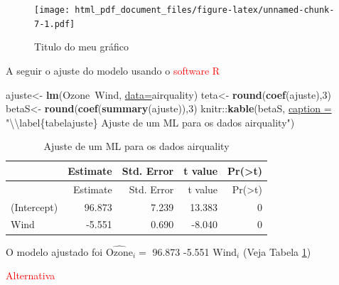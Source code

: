\documentclass[12pt,brazil,]{article}
\newenvironment{Shaded}{\begin{snugshade}}{\end{snugshade}}
\newcommand{\CharTok}[1]{\textcolor[rgb]{0.02,0.61,0.04}{#1}}
\newcommand{\DataTypeTok}[1]{\textcolor[rgb]{0.74,0.68,0.62}{\underline{#1}}}
\newcommand{\DecValTok}[1]{\textcolor[rgb]{0.27,0.67,0.26}{#1}}
\newcommand{\KeywordTok}[1]{\textcolor[rgb]{0.26,0.66,0.93}{\textbf{#1}}}
\newcommand{\NormalTok}[1]{\textcolor[rgb]{0.74,0.68,0.62}{#1}}
\newcommand{\OperatorTok}[1]{\textcolor[rgb]{0.74,0.68,0.62}{#1}}
\newcommand{\StringTok}[1]{\textcolor[rgb]{0.02,0.61,0.04}{#1}}
\begin{document}
\begin{figure}
\centering
\texttt{[image: html\_pdf\_document\_files/figure-latex/unnamed-chunk-7-1.pdf]}
\caption{\label{scatterplot}Titulo do meu gráfico}
\end{figure}

A seguir o ajuste do modelo usando o \textcolor{red}{software R}

\begin{Shaded}
\begin{Highlighting}[]
\NormalTok{ajuste<-}\StringTok{ }\KeywordTok{lm}\NormalTok{(Ozone}\OperatorTok{~}\NormalTok{Wind, }\DataTypeTok{data=}\NormalTok{airquality)}
\NormalTok{teta<-}\StringTok{ }\KeywordTok{round}\NormalTok{(}\KeywordTok{coef}\NormalTok{(ajuste),}\DecValTok{3}\NormalTok{)}
\NormalTok{betaS<-}\StringTok{ }\KeywordTok{round}\NormalTok{(}\KeywordTok{coef}\NormalTok{(}\KeywordTok{summary}\NormalTok{(ajuste)),}\DecValTok{3}\NormalTok{)}
\NormalTok{knitr}\OperatorTok{::}\KeywordTok{kable}\NormalTok{(betaS, }\DataTypeTok{caption =} \StringTok{"}\CharTok{\textbackslash{}\textbackslash{}}\StringTok{label\{tabelajuste\}}
\StringTok{             Ajuste de um ML para os dados airquality"}\NormalTok{)}
\end{Highlighting}
\end{Shaded}

\begin{longtable}[]{@{}lrrrr@{}}
\caption{\label{tabelajuste} Ajuste de um ML para os dados
airquality}\tabularnewline
\toprule
& Estimate & Std. Error & t value &
Pr(\textgreater{}\textbar{}t\textbar{})\tabularnewline
\midrule
\endfirsthead
\toprule
& Estimate & Std. Error & t value &
Pr(\textgreater{}\textbar{}t\textbar{})\tabularnewline
\midrule
\endhead
(Intercept) & 96.873 & 7.239 & 13.383 & 0\tabularnewline
Wind & -5.551 & 0.690 & -8.040 & 0\tabularnewline
\bottomrule
\end{longtable}

O modelo ajustado foi \(\widehat{\text{Ozone}}_i=\) 96.873 -5.551
\(\text{Wind}_i\) (Veja Tabela \ref{tabelajuste})

\textcolor{red}{Alternativa}

\begin{Shaded}
\end{Shaded}
\end{document}
